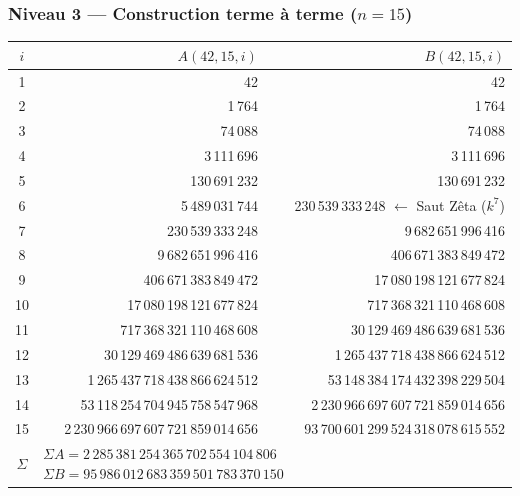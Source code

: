 \documentclass[11pt,a4paper]{article}
\begin{document}
\subsubsection{Niveau 3 --- Construction terme à terme (\texorpdfstring{$n = 15$}{n = 15})}
\begin{center}\small
\begin{tabular}{@{}c r r@{}}
\toprule
\rowcolor{spectralgris}
$i$ & $A(42,15,i)$ & $B(42,15,i)$ \\
\midrule
1 & 42 & 42 \\
2 & 1\,764 & 1\,764 \\
3 & 74\,088 & 74\,088 \\
4 & 3\,111\,696 & 3\,111\,696 \\
5 & 130\,691\,232 & 130\,691\,232 \\
6 & 5\,489\,031\,744 & 230\,539\,333\,248 \quad $\leftarrow$ Saut Zêta ($k^{7}$) \\
7 & 230\,539\,333\,248 & 9\,682\,651\,996\,416 \\
8 & 9\,682\,651\,996\,416 & 406\,671\,383\,849\,472 \\
9 & 406\,671\,383\,849\,472 & 17\,080\,198\,121\,677\,824 \\
10 & 17\,080\,198\,121\,677\,824 & 717\,368\,321\,110\,468\,608 \\
11 & 717\,368\,321\,110\,468\,608 & 30\,129\,469\,486\,639\,681\,536 \\
12 & 30\,129\,469\,486\,639\,681\,536 & 1\,265\,437\,718\,438\,866\,624\,512 \\
13 & 1\,265\,437\,718\,438\,866\,624\,512 & 53\,148\,384\,174\,432\,398\,229\,504 \\
14 & 53\,118\,254\,704\,945\,758\,547\,968 & 2\,230\,966\,697\,607\,721\,859\,014\,656 \\
15 & 2\,230\,966\,697\,607\,721\,859\,014\,656 & 93\,700\,601\,299\,524\,318\,078\,615\,552 \\
\midrule
$\Sigma$ & \multicolumn{2}{l}{$\Sigma A = 2\,285\,381\,254\,365\,702\,554\,104\,806$ \quad $\Sigma B = 95\,986\,012\,683\,359\,501\,783\,370\,150$} \\
\bottomrule
\end{tabular}
\end{center}
\end{document}
